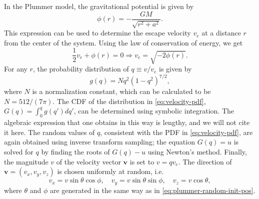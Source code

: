 In the Plummer model, the gravitational potential is given by
\begin{equation*}
    \phi(r) = -\frac{GM}{\sqrt{r^2 + a^2}}.
\end{equation*}
This expression can be used to determine the escape velocity \( v_e \) at a distance \( r \) from the center of the system.
Using the law of conservation of energy, we get
\begin{equation*}
    \frac{1}{2}v_e + \phi(r) = 0 \Rightarrow v_e = \sqrt{-2\phi(r)}.
\end{equation*}
For any $r$, the probability distribution of $q \equiv v/v_e$ is given by \cite{Aarseth1974Comparison}
\begin{equation}\label{eq:velocity-pdf}
    g(q) = N q^2(1-q^2)^{7/2},
\end{equation}
where $N$ is a normalization constant, which can be calculated to be $N = 512 / (7\pi)$.
The CDF of the distribution in \autoref{eq:velocity-pdf}, $G(q) = \int_0^q g(q') dq'$, can be determined using symbolic integration.
The algebraic expression that one obtains in this way is lengthy, and we will not cite it here.
The random values of $q$, consistent with the PDF in \autoref{eq:velocity-pdf}, are again obtained using inverse transform sampling;
the equation $G(q) = u$ is solved for $q$ by finding the roots of $G(q) - u$ using Newton's method.
Finally, the magnitude $v$ of the velocity vector $\mathbf{v}$ is set to $v = qv_e$.
The direction of $\mathbf{v} = (v_x, v_y, v_z)$ is chosen uniformly at random, i.e.
\begin{equation*}
    v_x = v\sin\theta \cos\phi, \quad v_y = v\sin\theta\sin\phi, \quad v_z = v\cos\theta,
\end{equation*}
where $\theta$ and $\phi$ are generated in the same way as in \autoref{eq:plummer-random-init-pos}.

